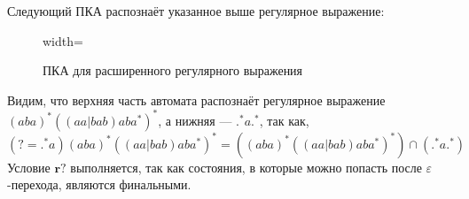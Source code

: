 \documentclass[a4paper, 12pt]{article}
\newcommand{\re}{\mathbf{r}}
\begin{document}
    Следующий ПКА распознаёт указанное выше регулярное выражение:

    \begin{figure}[H]
      \centering
      \begin{adjustbox}{width=\textwidth}
      
      \end{adjustbox}
      \caption{ПКА для расширенного регулярного выражения}
      \label{fig:afa-extended}
    \end{figure}

    Видим, что верхняя часть автомата распознаёт регулярное выражение $(aba)^{*}((aa | bab)aba^{*})^{*}$, а нижняя --- $.^* a .^*$, так как, 
    \[
      (?=.^*a)(aba)^{*}((aa | bab)aba^{*})^{*} = ((aba)^{*}((aa | bab)aba^{*})^{*}) \cap (.^* a .^*)
    \]
    Условие $\re?$ выполняется, так как состояния, в которые можно попасть после $\varepsilon$-перехода, являются финальными.
\end{document}

